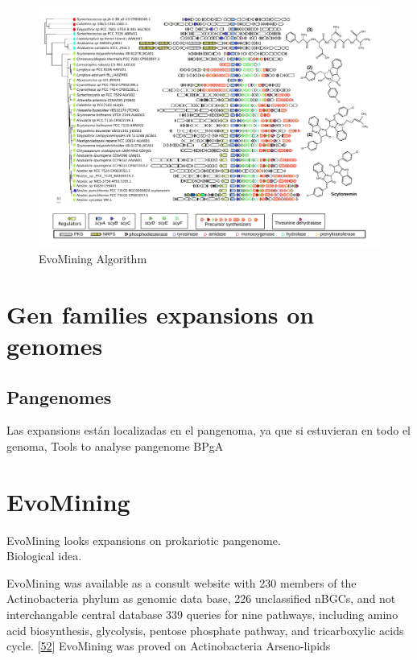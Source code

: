 \documentclass[12pt,twoside]{reedthesis}
\begin{document}
  \begin{figure}[h!tbp]
  \centering
  \includegraphics[angle = 0,scale = 1]{chapter2/FigurasPaper/Figure7.pdf}
  \caption[EvoMining Algorithm]{\normalsize{EvoMining Algorithm}}
  \label{fig:EvoMining Algorithms}
  \end{figure}
  
  \section{Gen families expansions on
  genomes}\label{gen-families-expansions-on-genomes}
  
  \subsection{Pangenomes}\label{pangenomes}
  
  Las expansions están localizadas en el pangenoma, ya que si estuvieran
  en todo el genoma, Tools to analyse pangenome BPgA
  
  \section{EvoMining}\label{evomining-1}
  
  EvoMining looks expansions on prokariotic pangenome.\\
  Biological idea.
  
  EvoMining was available as a consult website with 230 members of the
  Actinobacteria phylum as genomic data base, 226 unclassified nBGCs, and
  not interchangable central database 339 queries for nine pathways,
  including amino acid biosynthesis, glycolysis, pentose phosphate
  pathway, and tricarboxylic acids cycle.
  {[}\protect\hyperlink{ref-cruz-morales_phylogenomic_2016}{52}{]}
  EvoMining was proved on Actinobacteria Arseno-lipids
  
\end{document}

